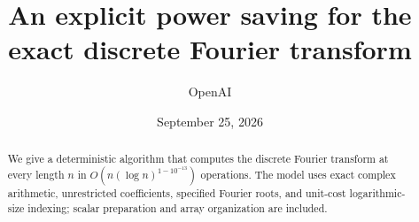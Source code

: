 \documentclass[11pt]{article}
\title{An explicit power saving for the exact discrete Fourier transform}
\author{OpenAI}
\date{September 25, 2026}
\theoremstyle{definition}
\numberwithin{equation}{section}
\begin{document}
\maketitle
\begin{abstract}
We give a deterministic algorithm that computes the discrete Fourier transform at every length $n$ in $O(n(\log n)^{1-10^{-13}})$ operations. The model uses exact complex arithmetic, unrestricted coefficients, specified Fourier roots, and unit-cost logarithmic-size indexing; scalar preparation and array organization are included.
\end{abstract}





\appendix

\clearpage
\begingroup
\raggedright


\endgroup
\end{document}
